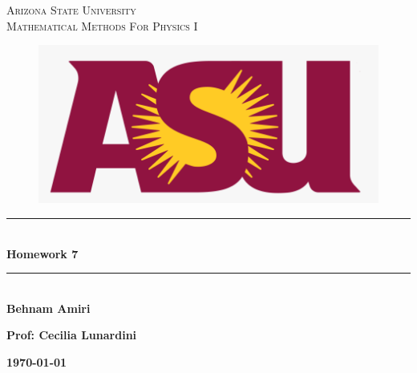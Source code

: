 \documentclass[fleqn]{article}
\begin{document}
  \begin{titlepage}

    \newcommand{\HRule}{\rule{\linewidth}{0.5mm}} %

    \center %
    


    \textsc{\LARGE Arizona State University}\\[1.5cm] %

    \textsc{\LARGE Mathematical Methods For Physics I }\\[1.5cm] %


    \begin{figure}
      \includegraphics[width=\linewidth]{asu.png}
    \end{figure}


    \HRule \\[0.4cm]
    { \huge \bfseries Homework 7}\\[0.4cm] 
    \HRule \\[1.5cm]
    
    \textbf{Behnam Amiri}

    \bigbreak

    \textbf{Prof: Cecilia Lunardini}

    \bigbreak


    \textbf{{\large \today}\\[2cm]}

    \vfill %

  \end{titlepage}
\end{document}

